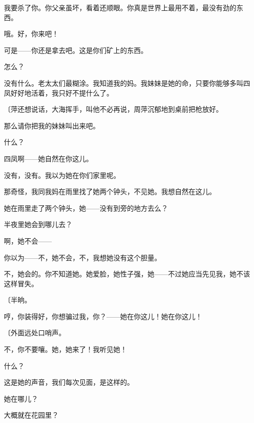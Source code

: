我要杀了你。你父亲虽坏，看着还顺眼。你真是世界上最用不着，最没有劲的东西。

哦。好，你来吧！

可是——你还是拿去吧。这是你们矿上的东西。

怎么？

没有什么。老太太们最糊涂。我知道我的妈。我妹妹是她的命，只要你能够多叫四凤好好地活着，我只好不提什么了。

{\fangsong〔萍还想说话，大海挥手，叫他不必再说，周萍沉郁地到桌前把枪放好。}

那么请你把我的妹妹叫出来吧。

什么？

四凤啊——她自然在你这儿。

没有，没有。我以为她在你们家里呢。

那奇怪，我同我妈在雨里找了她两个钟头，不见她。我想自然在这儿。

她在雨里走了两个钟头，她——没有到旁的地方去么？

半夜里她会到哪儿去？

啊，她不会——

你以为——不，她不会，不，我想她没有这个胆量。

不，她会的。你不知道她。她爱脸，她性子强，她——不过她应当先见我，她不该这样冒失。

{\fangsong〔半晌。}

哼，你装得好，你想骗过我，你？——她在你这儿！她在你这儿！

{\fangsong〔外面远处口哨声。}

不，你不要嚷。她，她来了！我听见她！

什么？

这是她的声音，我们每次见面，是这样的。

她在哪儿？

大概就在花园里？

